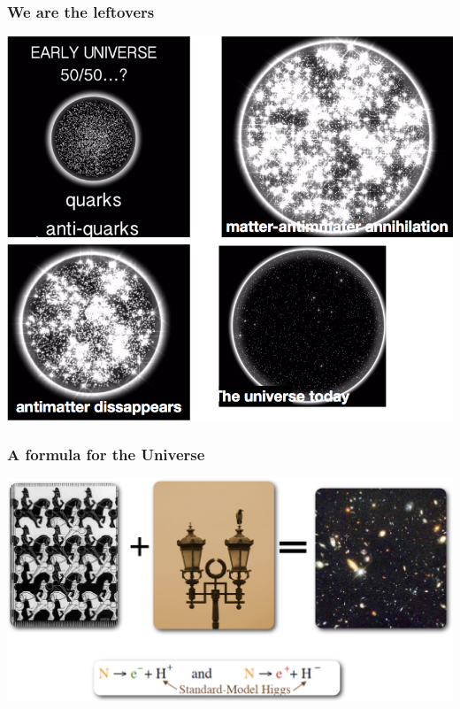 \begin{frame}
\frametitle{We are the leftovers}
\includegraphics[scale=0.30]{img/MissingUniverse.png}
\end{frame}
%

\begin{frame}
\frametitle{A formula for the Universe}
\includegraphics[scale=0.30]{img/formulaUniverse.png}
\end{frame}


